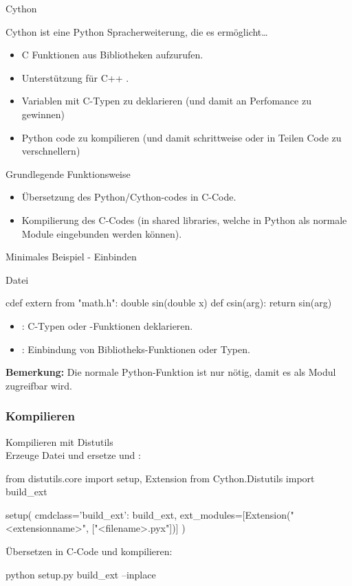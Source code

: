 \documentclass[hyperref={xetex}]{beamer}
\begin{document}
\begin{frame}[fragile]{Cython}

  \alert{Cython} ist eine Python Spracherweiterung, die es ermöglicht\ldots
\begin{itemize}
  \item C Funktionen aus Bibliotheken aufzurufen.\\
  \item Unterstützung für C++ .
  \item Variablen mit C-Typen zu deklarieren (und damit an Perfomance zu gewinnen)\\
  \item Python code zu kompilieren (und damit schrittweise oder in Teilen Code zu verschnellern)
\end{itemize}
Grundlegende Funktionsweise
\begin{itemize}
  \item Übersetzung des Python/Cython-codes in C-Code.
  \item Kompilierung des C-Codes (in shared libraries, welche in Python als normale Module eingebunden werden können).
\end{itemize}

\end{frame}

\begin{frame}[fragile]{Minimales Beispiel - Einbinden}

  Datei 
  \begin{pyin}
cdef extern from "math.h":
    double sin(double x)
def csin(arg):
    return sin(arg)
  \end{pyin}

  \begin{itemize}
    \item  {}: C-Typen oder -Funktionen deklarieren.
    \item {}: Einbindung von Bibliotheks-Funktionen oder Typen.
  \end{itemize}
  \textbf{Bemerkung:} Die normale Python-Funktion ist nur nötig, damit es als Modul zugreifbar wird.

\end{frame}

\begin{frame}[fragile]\frametitle{Kompilieren}

  Kompilieren mit \alert{Distutils}\\ 
Erzeuge Datei  und ersetze  und :
  \begin{pyin}
from distutils.core import setup, Extension
from Cython.Distutils import build_ext

setup(
        cmdclass={'build_ext': build_ext},
        ext_modules=[Extension("<extensionname>", ["<filename>.pyx"])]
     )
  \end{pyin}
Übersetzen in C-Code und kompilieren:
  \begin{pyin}
python setup.py build_ext --inplace
  \end{pyin}

\end{frame}
\end{document}
